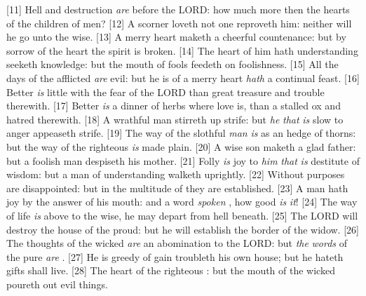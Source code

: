 [11] \textcolor[cmyk]{0.99998,1,0,0}{Hell and destruction \emph{are} before the LORD: how much more then the hearts of the children of men?}
[12] \textcolor[cmyk]{0.99998,1,0,0}{A scorner loveth not one  reproveth him: neither will he go unto the wise.}
[13] \textcolor[cmyk]{0.99998,1,0,0}{A merry heart maketh a cheerful countenance: but by sorrow of the heart the spirit is broken.}
[14] \textcolor[cmyk]{0.99998,1,0,0}{The heart of him  hath understanding seeketh knowledge: but the mouth of fools feedeth on foolishness.}
[15] \textcolor[cmyk]{0.99998,1,0,0}{All the days of the afflicted \emph{are} evil: but he  is of a merry heart \emph{hath} a continual feast.}
[16] \textcolor[cmyk]{0.99998,1,0,0}{Better \emph{is} little with the fear of the LORD than great treasure and trouble therewith.}
[17] \textcolor[cmyk]{0.99998,1,0,0}{Better \emph{is} a dinner of herbs where love is, than a stalled ox and hatred therewith.}
[18] \textcolor[cmyk]{0.99998,1,0,0}{A wrathful man stirreth up strife: but \emph{he} \emph{that} \emph{is} slow to anger appeaseth strife.}
[19] \textcolor[cmyk]{0.99998,1,0,0}{The way of the slothful \emph{man} \emph{is} as an hedge of thorns: but the way of the righteous \emph{is} made plain.}
[20] \textcolor[cmyk]{0.99998,1,0,0}{A wise son maketh a glad father: but a foolish man despiseth his mother.}
[21] \textcolor[cmyk]{0.99998,1,0,0}{Folly \emph{is} joy to \emph{him} \emph{that} \emph{is} destitute of wisdom: but a man of understanding walketh uprightly.}
[22] \textcolor[cmyk]{0.99998,1,0,0}{Without  purposes are disappointed: but in the multitude of  they are established.}
[23] \textcolor[cmyk]{0.99998,1,0,0}{A man hath joy by the answer of his mouth: and a word \emph{spoken} , how good \emph{is} \emph{it}!}
[24] \textcolor[cmyk]{0.99998,1,0,0}{The way of life \emph{is} above to the wise,  he may depart from hell beneath.}
[25] \textcolor[cmyk]{0.99998,1,0,0}{The LORD will destroy the house of the proud: but he will establish the border of the widow.}
[26] \textcolor[cmyk]{0.99998,1,0,0}{The thoughts of the wicked \emph{are} an abomination to the LORD: but \emph{the} \emph{words} of the pure \emph{are} .}
[27] \textcolor[cmyk]{0.99998,1,0,0}{He  is greedy of gain troubleth his own house; but he  hateth gifts shall live.}
[28] \textcolor[cmyk]{0.99998,1,0,0}{The heart of the righteous : but the mouth of the wicked poureth out evil things.}
